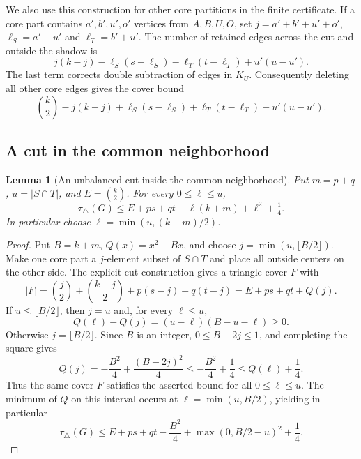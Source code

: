 \documentclass[11pt]{article}
\newtheorem{lemma}[theorem]{Lemma}
\newcommand{\tc}{\tau_{\triangle}}
\begin{document}
We also use this construction for other core partitions in the finite
certificate. If a core part contains $a',b',u',o'$ vertices from
$A,B,U,O$, set $j=a'+b'+u'+o'$, $\ell_S=a'+u'$ and $\ell_T=b'+u'$.
The number of retained edges across the cut and outside the shadow is
\[
 j(k-j)-\ell_S(s-\ell_S)-\ell_T(t-\ell_T)+u'(u-u').
\]
The last term corrects double subtraction of edges in $K_U$.
Consequently deleting all other core edges gives the cover bound
\begin{equation}\label{eq:general-shadow}
 \binom{k}{2}-j(k-j)+\ell_S(s-\ell_S)
       +\ell_T(t-\ell_T)-u'(u-u').
\end{equation}

\subsection{A cut in the common neighborhood}

\begin{lemma}[An unbalanced cut inside the common neighborhood]
\label{lem:common-cut}
Put $m=p+q$, $u=|S\cap T|$, and $E=\binom k2$. For every
$0\leq\ell\leq u$,
\[
 \tc(G)\leq E+ps+qt-\ell(k+m)+\ell^2+\tfrac14.
\]
In particular choose $\ell=\min(u,(k+m)/2)$.
\end{lemma}
\begin{proof}
Put $B=k+m$, $Q(x)=x^2-Bx$, and choose
$j=\min(u,\lfloor B/2\rfloor)$. Make one core part a $j$-element
subset of $S\cap T$ and place all outside centers on the other side.
The explicit cut construction gives a triangle cover $F$ with
\[
 |F|=\binom j2+\binom{k-j}2+p(s-j)+q(t-j)
     =E+ps+qt+Q(j).
\]
If $u\leq\lfloor B/2\rfloor$, then $j=u$ and, for every $\ell\leq u$,
\[
 Q(\ell)-Q(j)=(u-\ell)(B-u-\ell)\geq0.
\]
Otherwise $j=\lfloor B/2\rfloor$. Since $B$ is an integer,
$0\leq B-2j\leq1$, and completing the square gives
\[
 Q(j)=-\frac{B^2}{4}+\frac{(B-2j)^2}{4}
 \leq-\frac{B^2}{4}+\frac14
 \leq Q(\ell)+\frac14.
\]
Thus the same cover $F$ satisfies the asserted bound for all
$0\leq\ell\leq u$. The minimum of $Q$ on this interval occurs at
$\ell=\min(u,B/2)$, yielding in particular
\[
 \tc(G)\leq E+ps+qt-\frac{B^2}{4}
           +\max(0,B/2-u)^2+\frac14.
\]
\end{proof}
\end{document}
